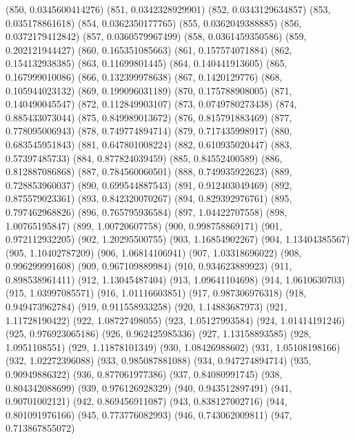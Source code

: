 {					(850, 0.0345600414276)
					(851, 0.0342328929901)
					(852, 0.0343129634857)
					(853, 0.035178861618)
					(854, 0.0362350177765)
					(855, 0.0362049388885)
					(856, 0.0372179412842)
					(857, 0.0360579967499)
					(858, 0.0361459350586)
					(859, 0.202121944427)
					(860, 0.165351085663)
					(861, 0.157574071884)
					(862, 0.154132938385)
					(863, 0.11699801445)
					(864, 0.140441913605)
					(865, 0.167999010086)
					(866, 0.132399978638)
					(867, 0.1420129776)
					(868, 0.105944023132)
					(869, 0.199096031189)
					(870, 0.175788908005)
					(871, 0.140490045547)
					(872, 0.112849903107)
					(873, 0.0749780273438)
					(874, 0.885433073044)
					(875, 0.849989013672)
					(876, 0.815791883469)
					(877, 0.778095006943)
					(878, 0.749774894714)
					(879, 0.717435998917)
					(880, 0.683545951843)
					(881, 0.647801008224)
					(882, 0.610935020447)
					(883, 0.57397485733)
					(884, 0.877824039459)
					(885, 0.84552400589)
					(886, 0.812887086868)
					(887, 0.784560060501)
					(888, 0.749935922623)
					(889, 0.728853960037)
					(890, 0.699544887543)
					(891, 0.912403049469)
					(892, 0.875579023361)
					(893, 0.842320070267)
					(894, 0.829392976761)
					(895, 0.797462968826)
					(896, 0.765795936584)
					(897, 1.04422707558)
					(898, 1.00765195847)
					(899, 1.00720607758)
					(900, 0.998758869171)
					(901, 0.972112932205)
					(902, 1.20295500755)
					(903, 1.16854902267)
					(904, 1.13404385567)
					(905, 1.10402787209)
					(906, 1.06814106941)
					(907, 1.03318696022)
					(908, 0.996299991608)
					(909, 0.967109889984)
					(910, 0.934623889923)
					(911, 0.898538961411)
					(912, 1.13045487404)
					(913, 1.09641104698)
					(914, 1.0610630703)
					(915, 1.03997085571)
					(916, 1.01116603851)
					(917, 0.987306976318)
					(918, 0.949473962784)
					(919, 0.911558933258)
					(920, 1.14883687973)
					(921, 1.11728190422)
					(922, 1.08727498055)
					(923, 1.05127993584)
					(924, 1.01414191246)
					(925, 0.976923065186)
					(926, 0.962425985336)
					(927, 1.13158893585)
					(928, 1.0951108551)
					(929, 1.11878101349)
					(930, 1.08426988602)
					(931, 1.05108198166)
					(932, 1.02272396088)
					(933, 0.985087881088)
					(934, 0.947274894714)
					(935, 0.90949886322)
					(936, 0.877061977386)
					(937, 0.84080991745)
					(938, 0.804342088699)
					(939, 0.976126928329)
					(940, 0.943512897491)
					(941, 0.90701002121)
					(942, 0.869456911087)
					(943, 0.838127002716)
					(944, 0.801091976166)
					(945, 0.773776082993)
					(946, 0.743062009811)
					(947, 0.713867855072)
}
